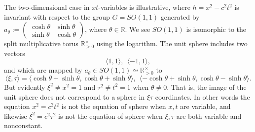 \documentclass[12pt]{amsart}
\theoremstyle{definition}
\theoremstyle{remark}
\newcommand{\bR}{\mathbb{R}}
\begin{document}
The two-dimensional case in $xt$-variables is illustrative, where $h=x^2-c^2 t^2$ is invariant with respect to the group $G=SO(1,1)$ generated by $a_\theta:=\begin{pmatrix} \cosh \theta & \sinh \theta \\
\sinh \theta & \cosh \theta
\end{pmatrix}$, where $\theta\in \bR$. We see $SO(1,1)$ is isomorphic to the split multiplicative torus $\bR^\times _{>0}$ using the logarithm. The unit sphere includes two vectors $$\langle 1, 1 \rangle,~~ \langle -1,1\rangle,$$ and which are mapped by $a_\theta \in SO(1,1) \simeq \bR^\times_{>0}$ to $$\langle \xi,\tau\rangle=\langle \cosh \theta+\sinh \theta, \cosh \theta+\sinh \theta \rangle,~~ \langle -\cosh \theta+\sinh \theta, \cosh \theta-\sinh \theta \rangle.$$ But evidently $\xi^2 \neq x^2=1$ and $\tau^2 \neq t^2=1$ when $\theta\neq 0$. That is, the image of the unit sphere does not correspond to a sphere in $\xi \tau$ coordinates. In other words the equation $x^2 = c^2 t^2$ is not the equation of sphere when $x,t$ are variable, and likewise $\xi^2=c^2 \tau^2$ is not the equation of sphere when $\xi,\tau$ are both variable and nonconstant. 
\end{document}
